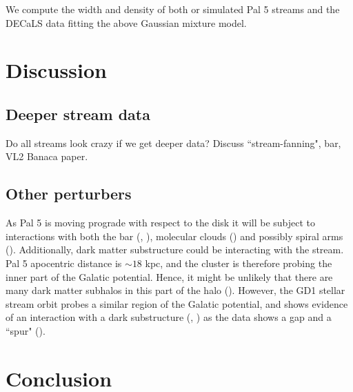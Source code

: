 \documentclass[modern]{aastex62}
\begin{document}

We compute the width and density of both or simulated Pal 5 streams and the DECaLS data fitting the above Gaussian mixture model. 




\section{Discussion}
\label{sec:discussion}

\subsection{Deeper stream data}
Do all streams look crazy if we get deeper data? Discuss ``stream-fanning", bar, VL2 Banaca paper. 

\subsection{Other perturbers}
As Pal 5 is moving prograde with respect to the disk it will be subject to interactions with both the bar (\citealt{Hattori:2016}, \citealt{price:2016b}), molecular clouds (\citealt{Amorisco:2016}) and possibly spiral arms (\citealt{Banik:2019}). Additionally, dark matter substructure could be interacting with the stream. Pal 5 apocentric distance is $\sim 18$ kpc, and the cluster is therefore probing the inner part of the Galatic potential. Hence, it might be unlikely that there are many dark matter subhalos in this part of the halo (\citealt{Garrison-Kimmel:2017}). However, the GD1 stellar stream orbit probes a similar region of the Galatic potential, and shows evidence of an interaction with a dark substructure (\citealt{Price-Whelan:2018}, \citealt{Bonaca:2018b}) as the data shows a gap and a ``spur" (\citealt{Yoon:2011}). 



\section{Conclusion}
\label{sec:conclusion}
\end{document}
